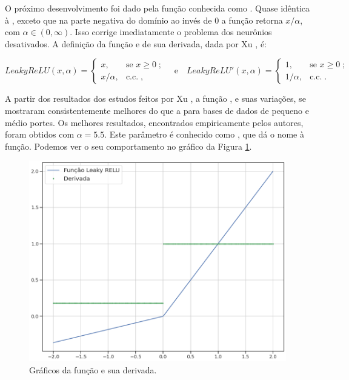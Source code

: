 O próximo desenvolvimento foi dado pela função conhecida como . Quase idêntica à , exceto que na parte negativa do domínio ao invés de $0$ a função retorna $x/\alpha$, com $\alpha \in (0, \infty)$. Isso corrige imediatamente o problema dos neurônios desativados. A definição da função e de sua derivada, dada por Xu \citep{xu_relu}, é:

\[
LeakyReLU(x, \alpha) = 
\begin{cases}
    	x, & \text{se } x\ge 0 \;;\\
    	x/\alpha, & \text{c.c.} \;,
	\end{cases}
\quad \text{e} \quad  
LeakyReLU'(x, \alpha) =
	\begin{cases}
    	1, & \text{se } x\ge 0 \;;\\
    	1/\alpha, & \text{c.c.} \;.
	\end{cases}
\]

A partir dos resultados dos estudos feitos por Xu \citep{xu_relu}, a função , e suas variações, se mostraram consistentemente melhores do que a  para bases de dados de pequeno e médio portes. Os melhores resultados, encontrados empiricamente pelos autores, foram obtidos com $\alpha = 5.5$. Este parâmetro é conhecido como , que dá o nome à função. Podemos ver o seu comportamento no gráfico da Figura \ref{fig:l_relu}.

\begin{figure}[htb]
\centering
\includegraphics[width=12cm]{figuras/l_relu}
\caption{Gráficos da função  e sua derivada.}
\label{fig:l_relu}
\end{figure}

